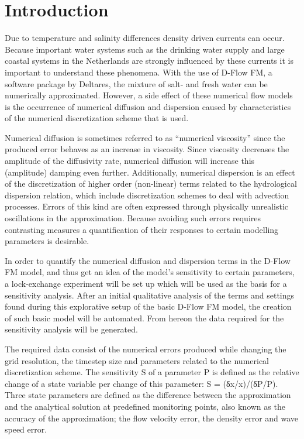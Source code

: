 \section{Introduction}\label{introduction}

Due to temperature and salinity differences density driven currents can
occur. Because important water systems such as the drinking water supply
and large coastal systems in the Netherlands are strongly influenced by
these currents it is important to understand these phenomena. With the
use of D-Flow FM, a software package by Deltares, the mixture of salt-
and fresh water can be numerically approximated. However, a side effect
of these numerical flow models is the occurrence of numerical diffusion
and dispersion caused by characteristics of the numerical discretization
scheme that is used.

Numerical diffusion is sometimes referred to as ``numerical viscosity''
since the produced error behaves as an increase in viscosity. Since
viscosity decreases the amplitude of the diffusivity rate, numerical
diffusion will increase this (amplitude) damping even further.
Additionally, numerical dispersion is an effect of the discretization of
higher order (non-linear) terms related to the hydrological dispersion
relation, which include discretization schemes to deal with advection
processes. Errors of this kind are often expressed through physically
unrealistic oscillations in the approximation. Because avoiding such
errors requires contrasting measures a quantification of their responses
to certain modelling parameters is desirable. \citep[
\citet{obrien_study_1950}]{zijlema_computational_2015}

In order to quantify the numerical diffusion and dispersion terms in the
D-Flow FM model, and thus get an idea of the model's sensitivity to
certain parameters, a lock-exchange experiment will be set up which will
be used as the basis for a sensitivity analysis. After an initial
qualitative analysis of the terms and settings found during this
explorative setup of the basic D-Flow FM model, the creation of such
basic model will be automated. From hereon the data required for the
sensitivity analysis will be generated.

The required data consist of the numerical errors produced while
changing the grid resolution, the timestep size and parameters related
to the numerical discretization scheme. The sensitivity S of a parameter
P is defined as the relative change of a state variable per change of
this parameter: S = (δx/x)/(δP/P). Three state parameters are defined as
the difference between the approximation and the analytical solution at
predefined monitoring points, also known as the accuracy of the
approximation; the flow velocity error, the density error and wave speed
error.

